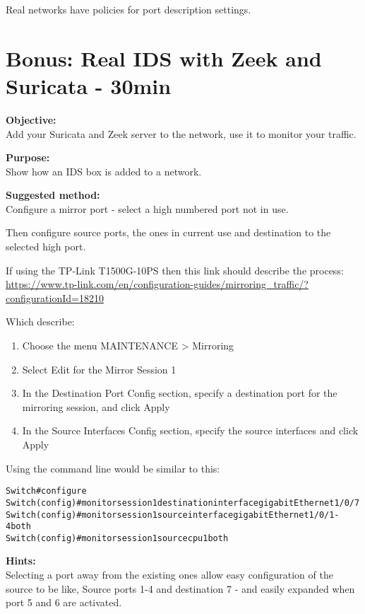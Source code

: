 \documentclass[a4paper,11pt,notitlepage]{report}
\begin{document}
Real networks have policies for port description settings.

\chapter{Bonus: Real IDS with Zeek and Suricata - 30min}
\label{ex:suricata-real-network}

{\bf Objective:}\\
Add your Suricata and Zeek server to the network, use it to monitor your traffic.

{\bf Purpose:}\\
Show how an IDS box is added to a network.

{\bf Suggested method:}\\
Configure a mirror port - select a high numbered port not in use.

Then configure source ports, the ones in current use and destination to the selected high port.

If using the TP-Link T1500G-10PS then this link should describe the process:\\
{\small\url{https://www.tp-link.com/en/configuration-guides/mirroring_traffic/?configurationId=18210}}

Which describe:
\begin{enumerate}
\item Choose the menu MAINTENANCE > Mirroring
\item Select Edit for the Mirror Session 1
\item In the Destination Port Config section, specify a destination port for the mirroring session, and click Apply
\item In the Source Interfaces Config section, specify the source interfaces and click Apply
\end{enumerate}

Using the command line would be similar to this:
\begin{alltt}
Switch#configure
Switch(config)#monitor session 1 destination interface gigabitEthernet 1/0/7
Switch(config)#monitor session 1 source interface gigabitEthernet 1/0/1-4 both
Switch(config)#monitor session 1 source cpu 1 both
\end{alltt}


{\bf Hints:}\\
Selecting a port away from the existing ones allow easy configuration of the source to be like, Source ports 1-4 and destination 7 - and easily expanded when port 5 and 6 are activated.
\end{document}
